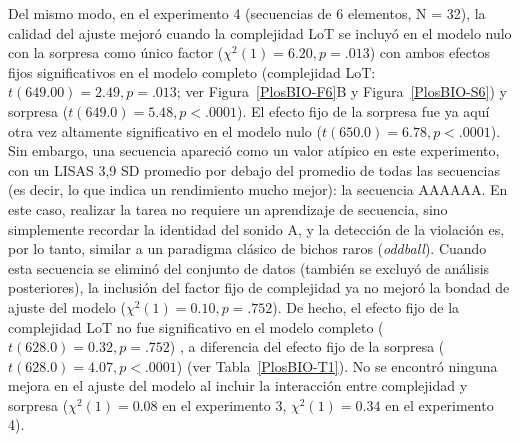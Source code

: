 
Del mismo modo, en el experimento 4 (secuencias de 6 elementos, N = 32), la calidad del ajuste mejoró cuando la complejidad LoT se incluyó en el modelo nulo con la sorpresa como único factor ($\chi^2(1) = 6.20 , p= .013$) con ambos efectos fijos significativos en el modelo completo (complejidad LoT: $t ( 649.00) = 2.49, p= .013$; ver Figura~\ref{PlosBIO-F6}B y Figura~\ref{PlosBIO-S6}) y sorpresa ($t ( 649.0) = 5.4 8, p <.0001$). El efecto fijo de la sorpresa fue ya aquí otra vez altamente significativo en el modelo nulo ($t (650.0) = 6.78 , p <.0001$). Sin embargo, una secuencia apareció como un valor atípico en este experimento, con un LISAS 3,9 SD promedio por debajo del promedio de todas las secuencias (es decir, lo que indica un rendimiento mucho mejor): la secuencia AAAAAA. En este caso, realizar la tarea no requiere un aprendizaje de secuencia, sino simplemente recordar la identidad del sonido A, y la detección de la violación es, por lo tanto, similar a un paradigma clásico de bichos raros (\textit{oddball}). Cuando esta secuencia se eliminó del conjunto de datos (también se excluyó de análisis posteriores), la inclusión del factor fijo de complejidad ya no mejoró la bondad de ajuste del modelo ($\chi^2 (1) = 0.10, p =.752$). De hecho, el efecto fijo de la complejidad LoT no fue significativo en el modelo completo ($t ( 628.0) = 0.32, p =.752$) , a diferencia del efecto fijo de la sorpresa ($t ( 628.0) = 4.07, p <.0001$) (ver Tabla~\ref{PlosBIO-T1}). No se encontró ninguna mejora en el ajuste del modelo al incluir la interacción entre complejidad y sorpresa ($\chi^2(1) = 0.08$ en el experimento 3, $\chi^2(1) = 0.34$ en el experimento 4).

